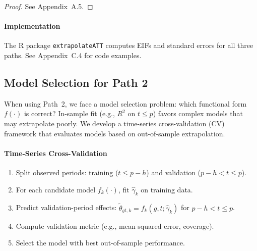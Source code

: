 \documentclass{article}
\begin{document}
\begin{proof}
See Appendix~A.5.
\end{proof}

\paragraph{Implementation}


The R package \texttt{extrapolateATT} computes EIFs and standard errors for all three paths. See Appendix~C.4 for code examples.

\subsection{Model Selection for Path 2}
\label{sec:model-selection}


When using Path~2, we face a model selection problem: which functional form $f(\cdot)$ is correct? In-sample fit (e.g., $R^2$ on $t \leq p$) favors complex models that may extrapolate poorly. We develop a time-series cross-validation (CV) framework that evaluates models based on out-of-sample extrapolation.

\paragraph{Time-Series Cross-Validation}


\begin{enumerate}
\item Split observed periods: training ($t \leq p - h$) and validation ($p - h < t \leq p$).
\item For each candidate model $f_k(\cdot)$, fit $\hat{\gamma}_k$ on training data.
\item Predict validation-period effects: $\tilde{\theta}_{gt,k} = f_k(g,t;\hat{\gamma}_k)$ for $p-h < t \leq p$.
\item Compute validation metric (e.g., mean squared error, coverage).
\item Select the model with best out-of-sample performance.
\end{enumerate}
\end{document}
